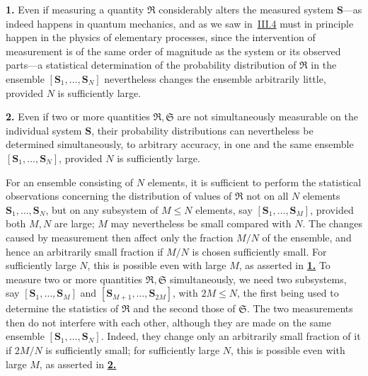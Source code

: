 \documentclass[fontsize=13pt,twoside,openany,headings=normal,parskip=false,bookmarkpackage=false,DIV=calc]{scrbook}
\begin{document}
\leavevmode{}\textbf{1.}\label{advantage:IV.1.1} Even if measuring a quantity $\mathfrak R$ considerably alters the measured system $\boldsymbol{S}$---as indeed happens in quantum mechanics, and as we saw in~\hyperref[sec:III.4]{III.4} must in principle happen in the physics of elementary processes, since the intervention of measurement is of the same order of magnitude as the system or its observed parts---a statistical determination of the probability distribution of $\mathfrak R$ in the ensemble $[\boldsymbol{S}_1,\ldots,\boldsymbol{S}_N]$ nevertheless changes the ensemble arbitrarily little, provided $N$ is sufficiently large.

\leavevmode{}\textbf{2.}\label{advantage:IV.1.2} Even if two or more quantities $\mathfrak R,\mathfrak S$ are not simultaneously measurable on the individual system $\boldsymbol{S}$, their probability distributions can nevertheless be determined simultaneously, to arbitrary accuracy, in one and the same ensemble $[\boldsymbol{S}_1,\ldots,\boldsymbol{S}_N]$, provided $N$ is sufficiently large.

For an ensemble consisting of $N$ elements, it is sufficient to perform the statistical observations concerning the distribution of values of $\mathfrak R$ not on all $N$ elements $\boldsymbol{S}_1,\ldots,\boldsymbol{S}_N$, but on any subsystem of $M\leq N$ elements, say $[\boldsymbol{S}_1,\ldots,\boldsymbol{S}_M]$, provided both $M,N$ are large; $M$ may nevertheless be small compared with $N$. The changes caused by measurement then affect only the fraction $M/N$ of the ensemble, and hence an arbitrarily small fraction if $M/N$ is chosen sufficiently small. For sufficiently large $N$, this is possible even with large $M$, as asserted in \hyperref[advantage:IV.1.1]{\textbf{1.}} To measure two or more quantities $\mathfrak R,\mathfrak S$ simultaneously, we need two subsystems, say $[\boldsymbol{S}_1,\ldots,\boldsymbol{S}_M]$ and $[\boldsymbol{S}_{M+1},\ldots,\boldsymbol{S}_{2M}]$, with $2M\leq N$, the first being used to determine the statistics of $\mathfrak R$ and the second those of $\mathfrak S$. The two measurements then do not interfere with each other, although they are made on the same ensemble $[\boldsymbol{S}_1,\ldots,\boldsymbol{S}_N]$. Indeed, they change only an arbitrarily small fraction of it if $2M/N$ is sufficiently small; for sufficiently large $N$, this is possible even with large $M$, as asserted in \hyperref[advantage:IV.1.2]{\textbf{2.}}
\end{document}
